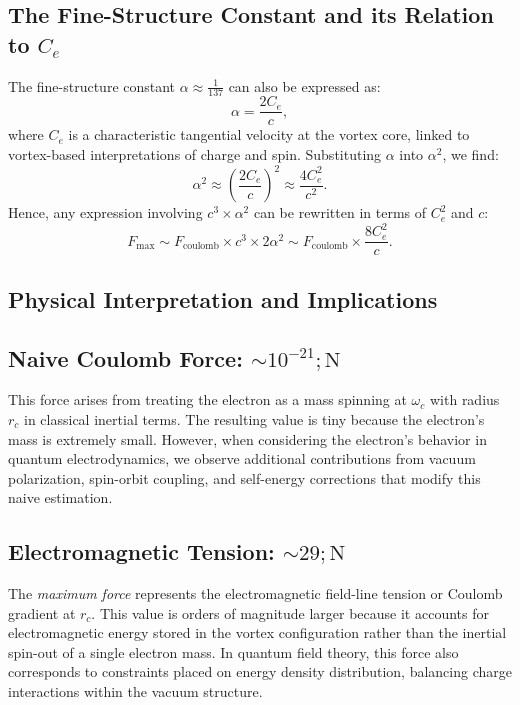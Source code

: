 \documentclass[a4paper,10pt]{article}
\begin{document}
\subsection*{The Fine-Structure Constant and its Relation to $C_e$}


The fine-structure constant $\alpha \approx \frac{1}{137}$ can also be expressed as:
\begin{equation*}
\alpha = \frac{2C_e}{c},
\end{equation*}
where $C_e$ is a characteristic tangential velocity at the vortex core, linked to vortex-based interpretations of charge and spin. Substituting $\alpha$ into $\alpha^2$, we find:
\begin{equation*}
\alpha^2 \approx \left(\frac{2C_e}{c}\right)^2 \approx \frac{4C_e^2}{c^2}.
\end{equation*}
Hence, any expression involving $c^3 \times \alpha^2$ can be rewritten in terms of $C_e^2$ and $c$:
\begin{equation*}
F_{\max} \sim F_\text{coulomb} \times c^3 \times 2\alpha^2 \sim F_\text{coulomb} \times \frac{8C_e^2}{c}.
\end{equation*}


\subsection*{Physical Interpretation and Implications}


\subsection*{Naive Coulomb Force: $\sim 10^{-21} ; \mathrm{N}$}


This force arises from treating the electron as a mass spinning at $\omega_c$ with radius $r_c$ in classical inertial terms. The resulting value is tiny because the electron's mass is extremely small. However, when considering the electron's behavior in quantum electrodynamics, we observe additional contributions from vacuum polarization, spin-orbit coupling, and self-energy corrections that modify this naive estimation.


\subsection*{Electromagnetic Tension: $\sim 29 ; \mathrm{N}$}


The \textit{maximum force} represents the electromagnetic field-line tension or Coulomb gradient at $r_c$. This value is orders of magnitude larger because it accounts for electromagnetic energy stored in the vortex configuration rather than the inertial spin-out of a single electron mass. In quantum field theory, this force also corresponds to constraints placed on energy density distribution, balancing charge interactions within the vacuum structure.
\end{document}
